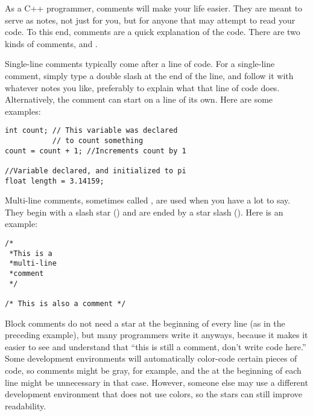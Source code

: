

As a C++ programmer, comments will make your life easier. 
They are meant to serve as notes, not just for you, but for anyone that may attempt to read your code. 
To this end, comments are a quick explanation of the code. 
There are two kinds of comments,  and .

Single-line comments typically come after a line of code. 
For a single-line comment, simply type a double slash \Code{//} at the end of the line, and follow it with whatever notes you like, preferably to explain what that line of code does.
Alternatively, the comment can start on a line of its own.
Here are some examples:

\noindent\begin{minipage}{\linewidth}\begin{lstlisting}
int count; // This variable was declared 
           // to count something
count = count + 1; //Increments count by 1

//Variable declared, and initialized to pi
float length = 3.14159; 
\end{lstlisting}\end{minipage}

Multi-line comments, sometimes called , are used when you have a lot to say. 
They begin with a slash star (\Code{/*}) and are ended by a star slash (\Code{*/}). 
Here is an example:

\noindent\begin{minipage}{\linewidth}\begin{lstlisting}
/* 
 *This is a
 *multi-line 
 *comment
 */
 
/* This is also a comment */ 
\end{lstlisting}\end{minipage}

Block comments do not need a star at the beginning of every line (as in the preceding example), but many programmers write it anyways, because it makes it easier to see and understand that ``this is still a comment, don't write code here.'' 
Some development environments will automatically color-code certain pieces of code, so comments might be gray, for example, and the \Code{*} at the beginning of each line might be unnecessary in that case. 
However, someone else may use a different development environment that does not use colors, so the stars can still improve readability.

